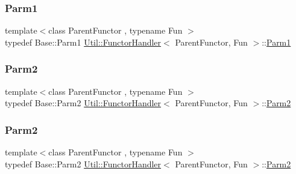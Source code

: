 \subsubsection{\texorpdfstring{Parm1}{Parm1}\hspace{0.1cm}{\footnotesize\ttfamily [3/3]}}
{\footnotesize\ttfamily template$<$class Parent\+Functor , typename Fun $>$ \\
typedef Base\+::\+Parm1 \mbox{\hyperlink{classUtil_1_1FunctorHandler}{Util\+::\+Functor\+Handler}}$<$ Parent\+Functor, Fun $>$\+::\mbox{\hyperlink{classUtil_1_1FunctorHandler_a0a902ba40a0ab746f1c29a81d68ae0db}{Parm1}}}

\mbox{\label{classUtil_1_1FunctorHandler_a5fb5374c316f8ac252aa22fcdf7d21a7}} 
\subsubsection{\texorpdfstring{Parm2}{Parm2}\hspace{0.1cm}{\footnotesize\ttfamily [1/3]}}
{\footnotesize\ttfamily template$<$class Parent\+Functor , typename Fun $>$ \\
typedef Base\+::\+Parm2 \mbox{\hyperlink{classUtil_1_1FunctorHandler}{Util\+::\+Functor\+Handler}}$<$ Parent\+Functor, Fun $>$\+::\mbox{\hyperlink{classUtil_1_1FunctorHandler_a5fb5374c316f8ac252aa22fcdf7d21a7}{Parm2}}}

\mbox{\label{classUtil_1_1FunctorHandler_a5fb5374c316f8ac252aa22fcdf7d21a7}} 
\subsubsection{\texorpdfstring{Parm2}{Parm2}\hspace{0.1cm}{\footnotesize\ttfamily [2/3]}}
{\footnotesize\ttfamily template$<$class Parent\+Functor , typename Fun $>$ \\
typedef Base\+::\+Parm2 \mbox{\hyperlink{classUtil_1_1FunctorHandler}{Util\+::\+Functor\+Handler}}$<$ Parent\+Functor, Fun $>$\+::\mbox{\hyperlink{classUtil_1_1FunctorHandler_a5fb5374c316f8ac252aa22fcdf7d21a7}{Parm2}}}

